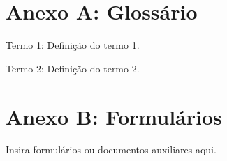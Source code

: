 \documentclass[
  a4paper,
  12pt
]{DPQISTreport}
\begin{document}
\appendix
{}

\section{Anexo A: Glossário}

Termo 1: Definição do termo 1.

Termo 2: Definição do termo 2.

\section{Anexo B: Formulários}

Insira formulários ou documentos auxiliares aqui.


\newpage
\printbibliography
\end{document}
